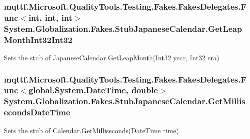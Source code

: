 \hypertarget{class_system_1_1_globalization_1_1_fakes_1_1_stub_japanese_calendar_adbfa1a61d725567f6b3c3bf0bb229c95}{
\subsubsection[{Get\-Leap\-Month\-Int32\-Int32}]{\setlength{\rightskip}{0pt plus 5cm}mqttf.\-Microsoft.\-Quality\-Tools.\-Testing.\-Fakes.\-Fakes\-Delegates.\-Func$<$int, int, int$>$ System.\-Globalization.\-Fakes.\-Stub\-Japanese\-Calendar.\-Get\-Leap\-Month\-Int32\-Int32}}\label{class_system_1_1_globalization_1_1_fakes_1_1_stub_japanese_calendar_adbfa1a61d725567f6b3c3bf0bb229c95}


Sets the stub of Japanese\-Calendar.\-Get\-Leap\-Month(\-Int32 year, Int32 era)

\hypertarget{class_system_1_1_globalization_1_1_fakes_1_1_stub_japanese_calendar_a2dfc6583cad9d78e64e53d84b5a82cb1}{
\subsubsection[{Get\-Milliseconds\-Date\-Time}]{\setlength{\rightskip}{0pt plus 5cm}mqttf.\-Microsoft.\-Quality\-Tools.\-Testing.\-Fakes.\-Fakes\-Delegates.\-Func$<$global.\-System.\-Date\-Time, double$>$ System.\-Globalization.\-Fakes.\-Stub\-Japanese\-Calendar.\-Get\-Milliseconds\-Date\-Time}}\label{class_system_1_1_globalization_1_1_fakes_1_1_stub_japanese_calendar_a2dfc6583cad9d78e64e53d84b5a82cb1}


Sets the stub of Calendar.\-Get\-Milliseconds(\-Date\-Time time)

